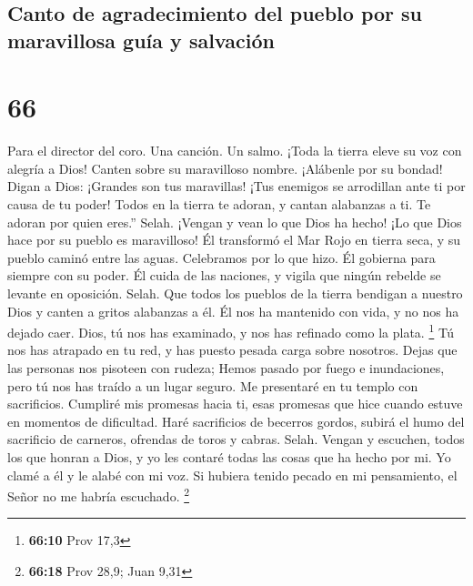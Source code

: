 \hypertarget{canto-de-agradecimiento-del-pueblo-por-su-maravillosa-guuxeda-y-salvaciuxf3n}{%
\subsection{Canto de agradecimiento del pueblo por su maravillosa guía y
salvación}\label{canto-de-agradecimiento-del-pueblo-por-su-maravillosa-guuxeda-y-salvaciuxf3n}}

\hypertarget{section-65}{%
\section{66}\label{section-65}}

Para el director del coro. Una canción. Un salmo.  ¡Toda la
tierra eleve su voz con alegría a Dios!  Canten sobre su
maravilloso nombre. ¡Alábenle por su bondad!  Digan a Dios:
¡Grandes son tus maravillas! ¡Tus enemigos se arrodillan ante ti por
causa de tu poder!  Todos en la tierra te adoran, y cantan
alabanzas a ti. Te adoran por quien eres.'' Selah.  ¡Vengan
y vean lo que Dios ha hecho! ¡Lo que Dios hace por su pueblo es
maravilloso!  Él transformó el Mar Rojo en tierra seca, y su
pueblo caminó entre las aguas. Celebramos por lo que hizo. 
Él gobierna para siempre con su poder. Él cuida de las naciones, y
vigila que ningún rebelde se levante en oposición. Selah. 
Que todos los pueblos de la tierra bendigan a nuestro Dios y canten a
gritos alabanzas a él.  Él nos ha mantenido con vida, y no
nos ha dejado caer.  Dios, tú nos has examinado, y nos has
refinado como la plata. \footnote{\textbf{66:10} Prov 17,3}
 Tú nos has atrapado en tu red, y has puesto pesada carga
sobre nosotros.  Dejas que las personas nos pisoteen con
rudeza; Hemos pasado por fuego e inundaciones, pero tú nos has traído a
un lugar seguro.  Me presentaré en tu templo con
sacrificios. Cumpliré mis promesas hacia ti,  esas promesas
que hice cuando estuve en momentos de dificultad.  Haré
sacrificios de becerros gordos, subirá el humo del sacrificio de
carneros, ofrendas de toros y cabras. Selah.  Vengan y
escuchen, todos los que honran a Dios, y yo les contaré todas las cosas
que ha hecho por mi.  Yo clamé a él y le alabé con mi voz.
 Si hubiera tenido pecado en mi pensamiento, el Señor no me
habría escuchado. \footnote{\textbf{66:18} Prov 28,9; Juan 9,31}

